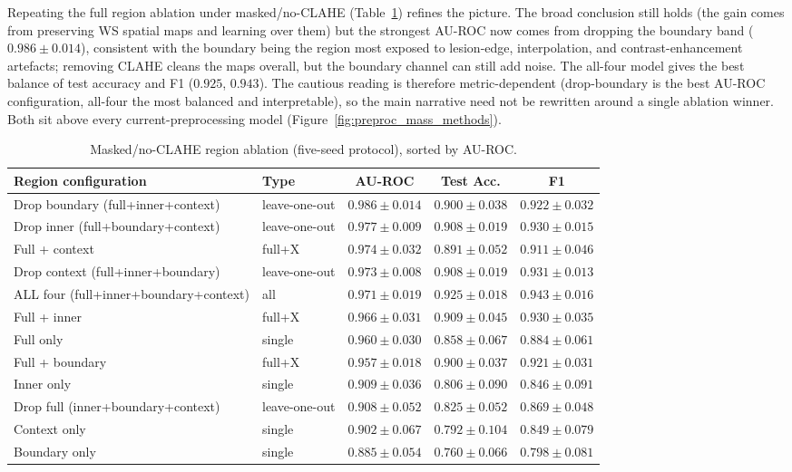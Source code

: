 Repeating the full region ablation under masked/no-CLAHE (Table~\ref{tab:preproc_region_ablation}) refines the picture. The broad conclusion still holds (the gain comes from preserving WS spatial maps and learning over them) but the strongest AU-ROC now comes from dropping the boundary band ($0.986 \pm 0.014$), consistent with the boundary being the region most exposed to lesion-edge, interpolation, and contrast-enhancement artefacts; removing CLAHE cleans the maps overall, but the boundary channel can still add noise. The all-four model gives the best balance of test accuracy and F1 ($0.925$, $0.943$). The cautious reading is therefore metric-dependent (drop-boundary is the best AU-ROC configuration, all-four the most balanced and interpretable), so the main narrative need not be rewritten around a single ablation winner. Both sit above every current-preprocessing model (Figure~\ref{fig:preproc_mass_methods}).

\begin{table}[H]
\centering
\caption[Masked/no-CLAHE region ablation for the WS-map CNN head]{Masked/no-CLAHE region ablation (five-seed protocol), sorted by AU-ROC.}
\label{tab:preproc_region_ablation}
\scriptsize
\begin{tabular}{llccc}
\toprule
\textbf{Region configuration} & \textbf{Type} & \textbf{AU-ROC} & \textbf{Test Acc.} & \textbf{F1} \\
\midrule
Drop boundary (full+inner+context) & leave-one-out & $0.986 \pm 0.014$ & $0.900 \pm 0.038$ & $0.922 \pm 0.032$ \\
Drop inner (full+boundary+context) & leave-one-out & $0.977 \pm 0.009$ & $0.908 \pm 0.019$ & $0.930 \pm 0.015$ \\
Full + context & full+X & $0.974 \pm 0.032$ & $0.891 \pm 0.052$ & $0.911 \pm 0.046$ \\
Drop context (full+inner+boundary) & leave-one-out & $0.973 \pm 0.008$ & $0.908 \pm 0.019$ & $0.931 \pm 0.013$ \\
ALL four (full+inner+boundary+context) & all & $0.971 \pm 0.019$ & $0.925 \pm 0.018$ & $0.943 \pm 0.016$ \\
Full + inner & full+X & $0.966 \pm 0.031$ & $0.909 \pm 0.045$ & $0.930 \pm 0.035$ \\
Full only & single & $0.960 \pm 0.030$ & $0.858 \pm 0.067$ & $0.884 \pm 0.061$ \\
Full + boundary & full+X & $0.957 \pm 0.018$ & $0.900 \pm 0.037$ & $0.921 \pm 0.031$ \\
Inner only & single & $0.909 \pm 0.036$ & $0.806 \pm 0.090$ & $0.846 \pm 0.091$ \\
Drop full (inner+boundary+context) & leave-one-out & $0.908 \pm 0.052$ & $0.825 \pm 0.052$ & $0.869 \pm 0.048$ \\
Context only & single & $0.902 \pm 0.067$ & $0.792 \pm 0.104$ & $0.849 \pm 0.079$ \\
Boundary only & single & $0.885 \pm 0.054$ & $0.760 \pm 0.066$ & $0.798 \pm 0.081$ \\
\bottomrule
\end{tabular}
\end{table}

